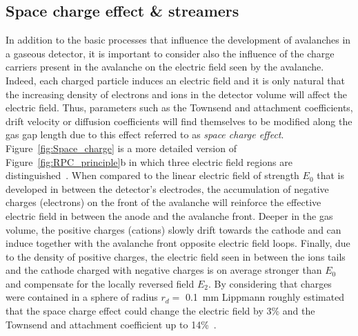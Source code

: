 	\subsection{Space charge effect \& streamers}
	\label{chapt3:ssec:space-charge}
	
	In addition to the basic processes that influence the development of avalanches in a gaseous detector, it is important to consider also the influence of the charge carriers present in the avalanche on the electric field seen by the avalanche. Indeed, each charged particle induces an electric field and it is only natural that the increasing density of electrons and ions in the detector volume will affect the electric field. Thus, parameters such as the Townsend and attachment coefficients, drift velocity or diffusion coefficients will find themselves to be modified along the gas gap length due to this effect referred to as \textit{space charge effect}. Figure~\ref{fig:Space_charge} is a more detailed version of Figure~\ref{fig:RPC_principle}b in which three electric field regions are distinguished~\cite{LIPPMANN2003}. When compared to the linear electric field of strength $E_0$ that is developed in between the detector's electrodes, the accumulation of negative charges (electrons) on the front of the avalanche will reinforce the effective electric field in between the anode and the avalanche front. Deeper in the gas volume, the positive charges (cations) slowly drift towards the cathode and can induce together with the avalanche front opposite electric field loops. Finally, due to the density of positive charges, the electric field seen in between the ions tails and the cathode charged with negative charges is on average stronger than $E_0$ and compensate for the locally reversed field $E_2$. By considering that  charges were contained in a sphere of radius $r_d =$ \SI{0.1}{mm} Lippmann roughly estimated that the space charge effect could change the electric field by 3\% and the Townsend and attachment coefficient up to 14\%~\cite{LIPPMANN2003,VINCENT2017}.
	
\begingroup\setlength{\intextsep}{5pt}\setlength{\columnsep}{15pt}
	
